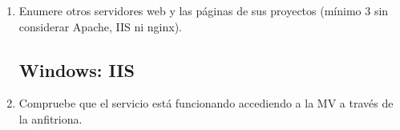 \documentclass[paper=a4, fontsize=11pt]{scrartcl} %
\numberwithin{equation}{section} %
\numberwithin{figure}{section} %
\numberwithin{table}{section} %
\begin{document}
\begin{enumerate}
		Para el caso de Ubuntu, instalaremos el servicio como un pack usando el comando \textit{sudo
		apt-get install lamp-server\^}.
		
		Para CentOS, lo instalaremos componente a componente para mostrar ambos métodos, es decir:
		\begin{itemize}
			\item \textit{httpd} para instalar el servicio Apache, lo añadiremos a la lista de
			ejecuciones durante el arranque con \textit{systemctl enable httpd.service}.
			
			\item \textit{mariadb} para la base de datos de Maria-DB\footnote{Originalmente, la base
			de datos a la que hace referencia es \textit{MySQL} pero hace algún tiempo, tomó fuerza la
			base de datos alternativa de \textit{Maria-DB}}
			
			\item \textit{php} y \textit{php-mysql} para el servidor PHP.
		\end{itemize}
		
		Por último, en ambos sistemas operativos reiniciaremos los servicios para asegurarnos que los
		cambios de configuración que se produjeron durante la instalación de los mismo surte efecto
		\footnote{Sería conveniente incluir el servicio de Apache para que sea capaz de atravesar el
		cortafuegos al tratarse de un servicio web}.
		
		\item Enumere otros servidores web y las páginas de sus proyectos (mínimo 3 sin considerar
		Apache, IIS ni nginx).
		
	
	\subsection{Windows: IIS}
		\item Compruebe que el servicio está funcionando accediendo a la MV a través de la anfitriona.

\end{enumerate}
\end{document}
